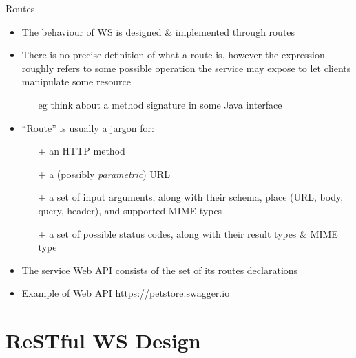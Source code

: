 \documentclass[presentation]{beamer}\mode<presentation>{\usetheme{AMSCesenaPurpleAndGold}}
\begin{document}
\begin{frame}{Routes}

    \begin{itemize}
        \item The behaviour of WS is designed \& implemented through \alert{routes}

        \vfill

        \item There is no precise definition of what a route is, however the expression roughly refers to some \alert{possible operation} the service may expose to let clients manipulate some \alert{resource}
        \begin{itemize}
            \item[eg] think about a method signature in some Java interface
        \end{itemize}

        \vfill

        \item ``Route'' is usually a \alert{jargon} for:
        \begin{itemize}
            \item[+] an HTTP \alert{method}

            \item[+] a (possibly \emph{parametric}) URL

            \item[+] a set of input arguments, along with their schema, place (URL, body, query, header), and supported MIME types

            \item[+] a set of possible status codes, along with their result types \& MIME type
        \end{itemize}

        \vfill

        \item The service \alert{Web API} consists of the set of its routes declarations

        \vfill

        \item Example of \alert{Web API} \url{https://petstore.swagger.io}
    \end{itemize}

\end{frame}

\section{ReSTful WS Design}
\end{document}

